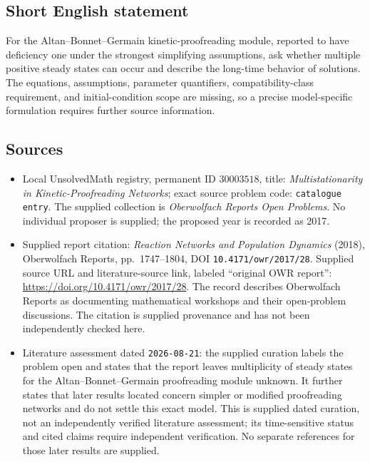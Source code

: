 \documentclass[11pt]{article}
\begin{document}
\subsection{Short English statement}
For the Altan--Bonnet--Germain kinetic-proofreading module, reported to have deficiency one under the strongest simplifying assumptions, ask whether multiple positive steady states can occur and describe the long-time behavior of solutions. The equations, assumptions, parameter quantifiers, compatibility-class requirement, and initial-condition scope are missing, so a precise model-specific formulation requires further source information.
\subsection{Sources}
\begin{itemize}
\item Local UnsolvedMath registry, permanent ID \(30003518\), title: \emph{Multistationarity in Kinetic-Proofreading Networks}; exact source problem code: \texttt{catalogue entry}. The supplied collection is \emph{Oberwolfach Reports Open Problems}. No individual proposer is supplied; the proposed year is recorded as 2017.
\item Supplied report citation: \emph{Reaction Networks and Population Dynamics} (2018), Oberwolfach Reports, pp.\ 1747--1804, DOI \texttt{10.4171/owr/2017/28}. Supplied source URL and literature-source link, labeled ``original OWR report'': \url{https://doi.org/10.4171/owr/2017/28}. The record describes Oberwolfach Reports as documenting mathematical workshops and their open-problem discussions. The citation is supplied provenance and has not been independently checked here.
\item Literature assessment dated \texttt{2026-08-21}: the supplied curation labels the problem open and states that the report leaves multiplicity of steady states for the Altan--Bonnet--Germain proofreading module unknown. It further states that later results located concern simpler or modified proofreading networks and do not settle this exact model. This is supplied dated curation, not an independently verified literature assessment; its time-sensitive status and cited claims require independent verification. No separate references for those later results are supplied.
\end{itemize}
\end{document}
